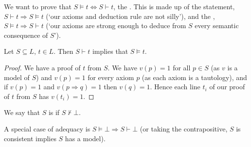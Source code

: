 \documentclass[a4paper, 10pt, twocolumn]{amsart}
\begin{document}
We want to prove that $S \models t \iff S \vdash t$, the .
This is made up of the  statement, $S \vdash t \Rightarrow S \models t$ (`our axioms and deduction rule are not silly'), and the , $S \models t \Rightarrow S \vdash t$ (`our axioms are strong enough to deduce from $S$ every semantic consequence of $S$').

\begin{proposition}[Soundness]
  Let $S \subseteq L$, $t \in L$. Then $S \vdash t$ implies that $S \models t$.
\end{proposition}
\begin{proof}
  We have a proof of $t$ from $S$. We have $v(p) = 1$ for all $p \in S$ (as $v$ is a model of $S$) and $v(p) = 1$ for every axiom $p$ (as each axiom is a tautology), and if $v(p) = 1$ and $v(p \Rightarrow q) = 1$ then $v(q) = 1$. Hence each line $t_i$ of our proof of $t$ from $S$ has $v(t_i) =1 $.
\end{proof}




\begin{definition}[Consistent]
  We say that $S$ is  if $S \not\vdash \bot$.
\end{definition}

A special case of adequacy is $S \models \bot \Rightarrow S \vdash \bot$ (or taking the contrapositive, $S$ is consistent implies $S$ has a model).
\end{document}
